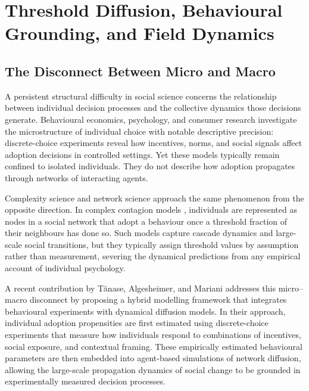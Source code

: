 \documentclass[12pt,a4paper]{article}
\theoremstyle{plain}
\theoremstyle{definition}
\begin{document}
\section{Threshold Diffusion, Behavioural Grounding, and Field Dynamics}
\label{sec:diffusion}

\subsection{The Disconnect Between Micro and Macro}

A persistent structural difficulty in social science concerns the relationship between individual decision processes and the collective dynamics those decisions generate. Behavioural economics, psychology, and consumer research investigate the microstructure of individual choice with notable descriptive precision: discrete-choice experiments reveal how incentives, norms, and social signals affect adoption decisions in controlled settings. Yet these models typically remain confined to isolated individuals. They do not describe how adoption propagates through networks of interacting agents.

Complexity science and network science approach the same phenomenon from the opposite direction. In complex contagion models \cite{Watts2002}, individuals are represented as nodes in a social network that adopt a behaviour once a threshold fraction of their neighbours has done so. Such models capture cascade dynamics and large-scale social transitions, but they typically assign threshold values by assumption rather than measurement, severing the dynamical predictions from any empirical account of individual psychology.

A recent contribution by Tănase, Algesheimer, and Mariani \cite{Tanase2026} addresses this micro--macro disconnect by proposing a hybrid modelling framework that integrates behavioural experiments with dynamical diffusion models. In their approach, individual adoption propensities are first estimated using discrete-choice experiments that measure how individuals respond to combinations of incentives, social exposure, and contextual framing. These empirically estimated behavioural parameters are then embedded into agent-based simulations of network diffusion, allowing the large-scale propagation dynamics of social change to be grounded in experimentally measured decision processes.
\end{document}
